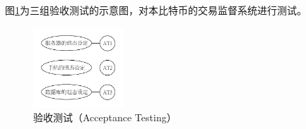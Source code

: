 \begin{enumerate}
				图\ref{AcceptanceTesting}为三组验收测试的示意图，对本比特币的交易监督系统进行测试。
					\begin{figure}[!htbp]
						\centering
						\includegraphics[width = 0.3\textwidth]{AcceptanceTesting.pdf}
						\caption{验收测试（Acceptance Testing）}\label{AcceptanceTesting}
					\end{figure}

	 		\end{enumerate}			

